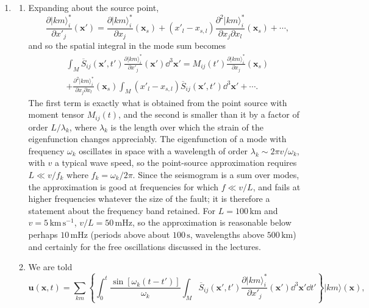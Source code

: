 \documentclass[a4paper,10pt]{paper}
\begin{document}
\begin{enumerate}
 \item
\begin{enumerate}
\item Expanding about the source point,
\begin{equation*}
    \frac{\partial|km\rangle_{i}^{*}}{\partial x'_{j}}(\mathbf{x}')=\frac{\partial|km\rangle_{i}^{*}}{\partial x_{j}}(\mathbf{x}_{s})
    +(x'_{l}-x_{s,l})\frac{\partial^{2}|km\rangle_{i}^{*}}{\partial x_{j}\partial x_{l}}(\mathbf{x}_{s})+\cdots,
\end{equation*}
and so the spatial integral in the mode sum becomes
\begin{multline*}
    \int_{M}\overline{S}_{ij}(\mathbf{x}',t')\frac{\partial|km\rangle_{i}^{*}}{\partial x'_{j}}(\mathbf{x}')\dd^{3}\mathbf{x}'
    =M_{ij}(t')\frac{\partial|km\rangle_{i}^{*}}{\partial x_{j}}(\mathbf{x}_{s}) \\
    +\frac{\partial^{2}|km\rangle_{i}^{*}}{\partial x_{j}\partial x_{l}}(\mathbf{x}_{s})
    \int_{M}(x'_{l}-x_{s,l})\overline{S}_{ij}(\mathbf{x}',t')\dd^{3}\mathbf{x}'+\cdots.
\end{multline*}
The first term is exactly what is obtained from the point source with moment tensor $M_{ij}(t)$, and the second is smaller than it by a 
factor of order $L/\lambda_{k}$, where $\lambda_{k}$ is the length over which the strain of the eigenfunction changes appreciably. 
The eigenfunction of a mode with frequency $\omega_{k}$ oscillates in space with a wavelength of order $\lambda_{k}\sim2\pi v/\omega_{k}$, with $v$ 
a typical wave speed, so the point-source approximation requires $L\ll v/f_{k}$ where $f_{k}=\omega_{k}/2\pi$. Since the seismogram is a sum 
over modes, the approximation is good at frequencies for which $f\ll v/L$, and fails at higher frequencies whatever the size of the 
fault; it is therefore a statement about the frequency band retained. For $L=100\,\mathrm{km}$ and $v=5\,\mathrm{km\,s^{-1}}$, 
$v/L=50\,\mathrm{mHz}$, so the approximation is reasonable below perhaps $10\,\mathrm{mHz}$ (periods above about $100\,\mathrm{s}$, 
wavelengths above $500\,\mathrm{km}$) and certainly for the free oscillations discussed in the lectures.
\item We are told
\begin{equation*}
    \mathbf{u}(\mathbf{x},t) = \sum_{km}\left\{\int_{0}^{t}\frac{\sin[\omega_{k}(t-t')]}{\omega_{k}}\int_{M}\overline{S}_{ij}(\mathbf{x}',t')\frac{\partial|km\rangle_{i}^{*}}{\partial x'_{j}}(\mathbf{x}')\dd^{3}\mathbf{x}'\dd t'\right\}|km\rangle(\mathbf{x}),
\end{equation*}

\end{enumerate}
\end{enumerate}
\end{document}
